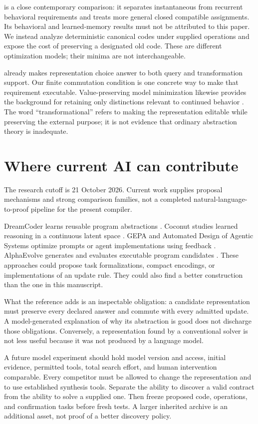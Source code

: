 \documentclass[11pt,letterpaper]{article}
\theoremstyle{remark}\newtheorem{remark}{Remark}[section]
\begin{document}
\citet{li2026} is a close contemporary comparison: it separates instantaneous from recurrent behavioral requirements and treats more general closed compatible assignments. Its behavioral and learned-memory results must not be attributed to this paper. We instead analyze deterministic canonical codes under supplied operations and expose the cost of preserving a designated old code. These are different optimization models; their minima are not interchangeable.

\citet{darwiche} already makes representation choice answer to both query and transformation support. Our finite commutation condition is one concrete way to make that requirement executable. Value-preserving model minimization likewise provides the background for retaining only distinctions relevant to continued behavior \citep{givan}. The word ``transformational'' refers to making the representation editable while preserving the external purpose; it is not evidence that ordinary abstraction theory is inadequate.

\section{Where current AI can contribute}
\label{sec:ai}
The research cutoff is 21 October 2026. Current work supplies proposal mechanisms and strong comparison families, not a completed natural-language-to-proof pipeline for the present compiler.

DreamCoder learns reusable program abstractions \citep{dreamcoder}. Coconut studies learned reasoning in a continuous latent space \citep{coconut}. GEPA and Automated Design of Agentic Systems optimize prompts or agent implementations using feedback \citep{gepa,adas}. AlphaEvolve generates and evaluates executable program candidates \citep{alphaevolve}. These approaches could propose task formalizations, compact encodings, or implementations of an update rule. They could also find a better construction than the one in this manuscript.

What the reference adds is an inspectable obligation: a candidate representation must preserve every declared answer and commute with every admitted update. A model-generated explanation of why its abstraction is good does not discharge those obligations. Conversely, a representation found by a conventional solver is not less useful because it was not produced by a language model.

A future model experiment should hold model version and access, initial evidence, permitted tools, total search effort, and human intervention comparable. Every competitor must be allowed to change the representation and to use established synthesis tools. Separate the ability to discover a valid contract from the ability to solve a supplied one. Then freeze proposed code, operations, and confirmation tasks before fresh tests. A larger inherited archive is an additional asset, not proof of a better discovery policy.
\end{document}
